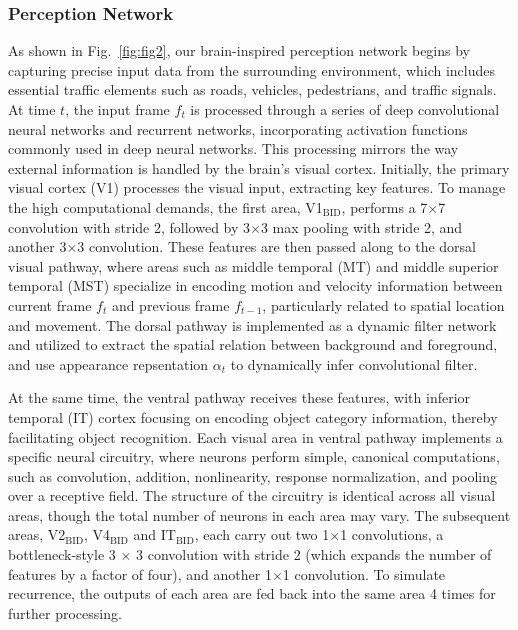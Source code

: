 \subsubsection{Perception Network}
\hspace{1pc}As shown in Fig.~\ref{fig:fig2}, our brain-inspired perception network begins by capturing precise input data from the surrounding environment, which includes essential traffic elements such as roads, vehicles, pedestrians, and traffic signals. 
At time $t$, the input frame $f_t$ is processed through a series of deep convolutional neural networks and recurrent networks, incorporating activation functions commonly used in deep neural networks. 
This processing mirrors the way external information is handled by the brain's visual cortex. 
Initially, the primary visual cortex (V1) processes the visual input, extracting key features. 
To manage the high computational demands, the first area, V1$_\text{BID}$, performs a 7$\times$7 convolution with stride 2, followed by 3$\times$3 max pooling with stride 2, and another 3$\times$3 convolution. 
These features are then passed along to the dorsal visual pathway, where areas such as middle temporal (MT) and middle superior temporal (MST) specialize in encoding motion and velocity information between current frame $ f_t $ and previous frame $ f_{t-1} $, particularly related to spatial location and movement\cite{wang2022btn}. 
The dorsal pathway is implemented as a dynamic filter network\cite{jia2016dynamic} and utilized to extract the spatial relation between background and foreground, 
and use appearance repsentation $ \alpha_t $ to dynamically infer convolutional filter.


At the same time, the ventral pathway receives these features, with inferior temporal (IT) cortex focusing on encoding object category information, thereby facilitating object recognition.
Each visual area in ventral pathway implements a specific neural circuitry, where neurons perform simple, canonical computations, such as convolution, addition, nonlinearity, response normalization, and pooling over a receptive field. 
The structure of the circuitry is identical across all visual areas, though the total number of neurons in each area may vary.
The subsequent areas, V2$_\text{BID}$, V4$_\text{BID}$ and IT$_\text{BID}$, each carry out two 1$\times$1 convolutions, a bottleneck-style 3 $ \times $ 3 convolution with stride 2 (which expands the number of features by a factor of four), and another 1$\times$1 convolution. 
To simulate recurrence, the outputs of each area are fed back into the same area 4 times for further processing.


